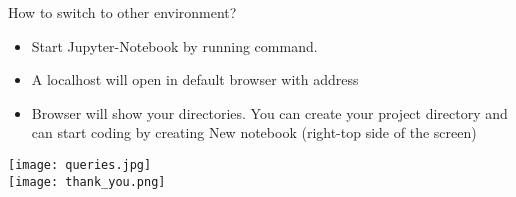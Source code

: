 \begin{frame}{How to switch to other environment?}
\begin{itemize}
\item Start Jupyter-Notebook by running command.

 \item A localhost will open in default browser with address


\item Browser will show your directories. You can create your project directory and can start coding by creating New notebook (right-top side of the screen)

\end{itemize}
\end{frame}

{
\makeatletter
{}
\makeatother

\begin{frame}
\centering
\texttt{[image: queries.jpg]}\\
\texttt{[image: thank\_you.png]}
\end{frame}
}




